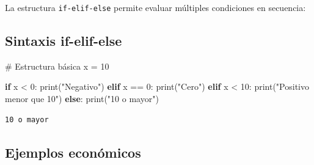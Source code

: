 \documentclass[
  doc,
  floatsintext,
  longtable,
  a4paper,
  nolmodern,
  notxfonts,
  notimes,
  12pt,
  colorlinks=true,linkcolor=blue,citecolor=blue,urlcolor=blue]{apa7}
\newenvironment{Shaded}{\begin{snugshade}}{\end{snugshade}}
\newcommand{\BuiltInTok}[1]{\textcolor[rgb]{0.00,0.23,0.31}{#1}}
\newcommand{\CommentTok}[1]{\textcolor[rgb]{0.37,0.37,0.37}{#1}}
\newcommand{\ControlFlowTok}[1]{\textcolor[rgb]{0.00,0.23,0.31}{\textbf{#1}}}
\newcommand{\DecValTok}[1]{\textcolor[rgb]{0.68,0.00,0.00}{#1}}
\newcommand{\NormalTok}[1]{\textcolor[rgb]{0.00,0.23,0.31}{#1}}
\newcommand{\OperatorTok}[1]{\textcolor[rgb]{0.37,0.37,0.37}{#1}}
\newcommand{\StringTok}[1]{\textcolor[rgb]{0.13,0.47,0.30}{#1}}
\begin{document}
La estructura \texttt{if-elif-else} permite evaluar múltiples
condiciones en secuencia:

\subsection{Sintaxis if-elif-else}\label{sintaxis-if-elif-else}

\begin{Shaded}
\begin{Highlighting}[]
\CommentTok{\# Estructura básica}
\NormalTok{x }\OperatorTok{=} \DecValTok{10}

\ControlFlowTok{if}\NormalTok{ x }\OperatorTok{\textless{}} \DecValTok{0}\NormalTok{:}
    \BuiltInTok{print}\NormalTok{(}\StringTok{"Negativo"}\NormalTok{)}
\ControlFlowTok{elif}\NormalTok{ x }\OperatorTok{==} \DecValTok{0}\NormalTok{:}
    \BuiltInTok{print}\NormalTok{(}\StringTok{"Cero"}\NormalTok{)}
\ControlFlowTok{elif}\NormalTok{ x }\OperatorTok{\textless{}} \DecValTok{10}\NormalTok{:}
    \BuiltInTok{print}\NormalTok{(}\StringTok{"Positivo menor que 10"}\NormalTok{)}
\ControlFlowTok{else}\NormalTok{:}
    \BuiltInTok{print}\NormalTok{(}\StringTok{"10 o mayor"}\NormalTok{)}
\end{Highlighting}
\end{Shaded}

\begin{verbatim}
10 o mayor
\end{verbatim}

\subsection{Ejemplos económicos}\label{ejemplos-econuxf3micos-2}
\end{document}
